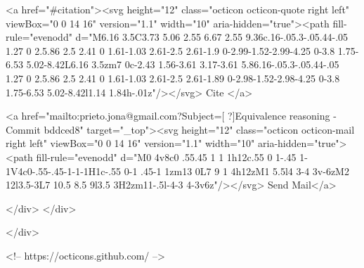       <a  href="#citation"><svg height="12" class="octicon octicon-quote right left" viewBox="0 0 14 16" version="1.1" width="10" aria-hidden="true"><path fill-rule="evenodd" d="M6.16 3.5C3.73 5.06 2.55 6.67 2.55 9.36c.16-.05.3-.05.44-.05 1.27 0 2.5.86 2.5 2.41 0 1.61-1.03 2.61-2.5 2.61-1.9 0-2.99-1.52-2.99-4.25 0-3.8 1.75-6.53 5.02-8.42L6.16 3.5zm7 0c-2.43 1.56-3.61 3.17-3.61 5.86.16-.05.3-.05.44-.05 1.27 0 2.5.86 2.5 2.41 0 1.61-1.03 2.61-2.5 2.61-1.89 0-2.98-1.52-2.98-4.25 0-3.8 1.75-6.53 5.02-8.42l1.14 1.84h-.01z"/></svg> Cite
      </a>

      <a href="mailto:prieto.jona@gmail.com?Subject=[ ?]Equivalence reasoning - Commit bddced8" target="_top"><svg height="12" class="octicon octicon-mail right left" viewBox="0 0 14 16" version="1.1" width="10" aria-hidden="true"><path fill-rule="evenodd" d="M0 4v8c0 .55.45 1 1 1h12c.55 0 1-.45 1-1V4c0-.55-.45-1-1-1H1c-.55 0-1 .45-1 1zm13 0L7 9 1 4h12zM1 5.5l4 3-4 3v-6zM2 12l3.5-3L7 10.5 8.5 9l3.5 3H2zm11-.5l-4-3 4-3v6z"/></svg> Send Mail</a>

    </div>
  </div>

</div>

<!-- https://octicons.github.com/ -->





